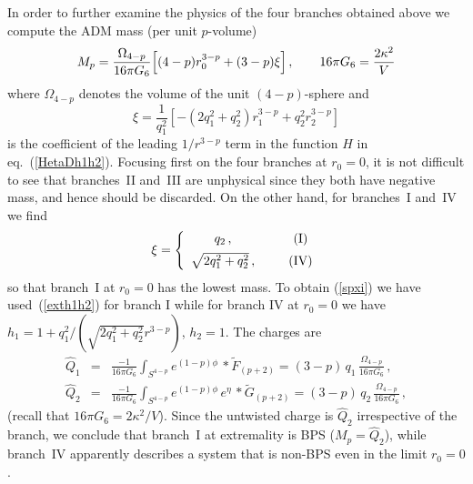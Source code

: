 \documentclass[a4paper,11pt]{article}
\newcommand{\eqref}[1]{(\ref{#1})}
\begin{document}
In order to further examine the physics of the four branches obtained
above we compute the ADM mass (per unit $p$-volume)
\begin{equation}
M_p = \frac{\Omega_{4-p}}{16\pi G_6 }\Big[ (4-p) r_0^{3-p} + (3-p) \xi
\Big]  \,,\qquad 16 \pi G_6 = \frac{2 \kappa^2}{V}
\end{equation}
where $\Omega_{4-p}$ denotes the volume of the unit $(4-p)$-sphere and
\begin{equation}
\label{xidef}
\xi = \frac{1}{q_1^2}\left[ -( 2 q_1^2 + q_2^2) r_1^{3-p} + q_2^2
  r_2^{3-p}  \right]
\end{equation}
is the coefficient of the leading $1/r^{3-p}$ term in the function
$H$ in eq.~\eqref{HetaDh1h2}. Focusing first on the four branches at
$r_0=0$, it is not difficult to see that branches~II and~III are
unphysical since they both have negative mass, and hence should be
discarded. On the other hand, for branches~I and~IV we find
\begin{equation}
\label{spxi}
\xi = \left\{ \begin{array}{ccc} q_2\,, &~~& {\rm(I)} \\[1ex]
\sqrt{2q_1^2 +q_2^2}\,, & &{\rm(IV)} \end{array} \right.
\end{equation}
so that branch~I at $r_0=0$ has the lowest mass.
To obtain \eqref{spxi} we have used~\eqref{exth1h2} for branch I while 
for branch IV at $r_0=0$  we have
$ h_1 = 1 + q_1^2/(\sqrt{2 q_1^2 + q_2^2} r^{3-p} )$, $h_2 =1$.
The charges are
%
\begin{eqnarray}
\label{Q1}
\hat{Q}_1 &=& \frac{- 1}{16\pi G_6 } \int_{S^{4-p}} e^{(1-p)\phi}\,
    {*}\tilde{F}_{(p+2)} = (3-p)\, q_1\,\frac{\Omega_{4-p}}{16\pi G_6 } \,,
        \\[1ex]
%
\label{Q2}
\hat{Q}_2 &=& \frac{- 1}{16\pi G_6 } \int_{S^{4-p}} e^{(1-p)\phi}\,e^\eta\,
  {*}\tilde{G}_{(p+2)} = (3-p)\,q_2\,\frac{\Omega_{4-p}}{16\pi G_6 } \,,
\end{eqnarray}
%
(recall that $16\pi G_6 = 2\kappa^2/V$).
Since the untwisted charge is $\hat{Q}_2$ irrespective of the branch,
we conclude that branch~I at extremality is BPS ($M_p = \hat Q_2$), while
branch~IV apparently describes a system that is non-BPS even in the limit
$r_0 = 0$.
\end{document}
